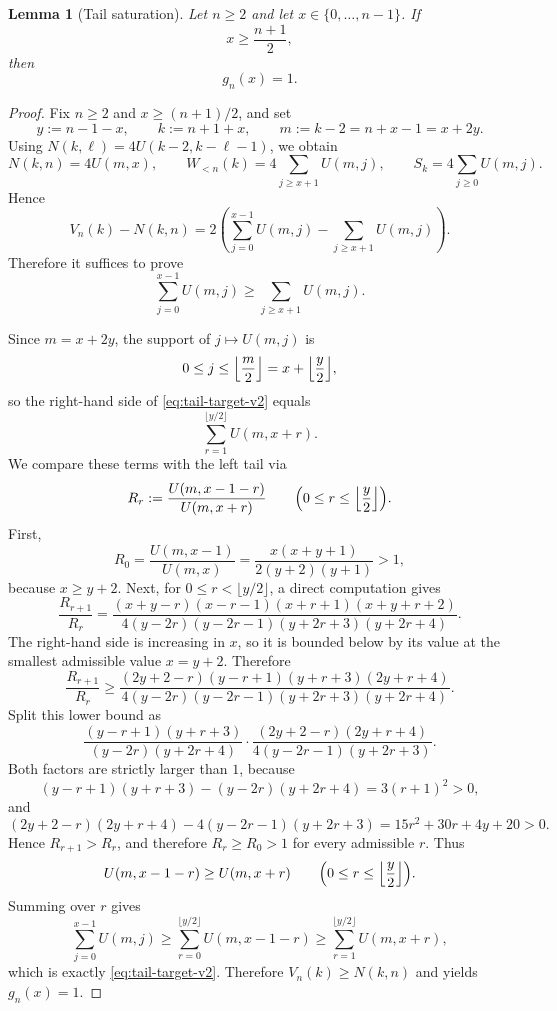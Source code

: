 \documentclass[10pt,a4paper]{amsart}
\newtheorem{lemma}{Lemma}
\begin{document}
\begin{lemma}[Tail saturation]\label{lem:tail}
Let $n\ge2$ and let $x\in\{0,\dots,n-1\}$. If
\[
x\ge \frac{n+1}{2},
\]
then
\[
g_n(x)=1.
\]
\end{lemma}

\begin{proof}
Fix $n\ge2$ and $x\ge (n+1)/2$, and set
\[
y:=n-1-x,
\qquad
k:=n+1+x,
\qquad
m:=k-2=n+x-1=x+2y.
\]
Using $N(k,\ell)=4U(k-2,k-\ell-1)$, we obtain
\[
N(k,n)=4U(m,x),
\qquad
W_{<n}(k)=4\sum_{j\ge x+1}U(m,j),
\qquad
S_k=4\sum_{j\ge0}U(m,j).
\]
Hence
\[
V_n(k)-N(k,n)
=2\left(\sum_{j=0}^{x-1}U(m,j)-\sum_{j\ge x+1}U(m,j)\right).
\]
Therefore it suffices to prove
\begin{equation}\label{eq:tail-target-v2}
\sum_{j=0}^{x-1}U(m,j)\ge \sum_{j\ge x+1}U(m,j).
\end{equation}

Since $m=x+2y$, the support of $j\mapsto U(m,j)$ is
\[
0\le j\le \Bigl\lfloor\frac m2\Bigr\rfloor=x+\Bigl\lfloor\frac y2\Bigr\rfloor,
\]
so the right-hand side of \eqref{eq:tail-target-v2} equals
\[
\sum_{r=1}^{\lfloor y/2\rfloor}U(m,x+r).
\]
We compare these terms with the left tail via
\[
R_r:=\frac{U(m,x-1-r)}{U(m,x+r)}
\qquad
\Bigl(0\le r\le \Bigl\lfloor\frac y2\Bigr\rfloor\Bigr).
\]
First,
\[
R_0=\frac{U(m,x-1)}{U(m,x)}=\frac{x(x+y+1)}{2(y+2)(y+1)}>1,
\]
because $x\ge y+2$.
Next, for $0\le r<\lfloor y/2\rfloor$, a direct computation gives
\[
\frac{R_{r+1}}{R_r}
=
\frac{(x+y-r)(x-r-1)(x+r+1)(x+y+r+2)}
{4(y-2r)(y-2r-1)(y+2r+3)(y+2r+4)}.
\]
The right-hand side is increasing in $x$, so it is bounded below by its value at the smallest admissible value $x=y+2$. Therefore
\[
\frac{R_{r+1}}{R_r}
\ge
\frac{(2y+2-r)(y-r+1)(y+r+3)(2y+r+4)}
{4(y-2r)(y-2r-1)(y+2r+3)(y+2r+4)}.
\]
Split this lower bound as
\[
\frac{(y-r+1)(y+r+3)}{(y-2r)(y+2r+4)}
\cdot
\frac{(2y+2-r)(2y+r+4)}{4(y-2r-1)(y+2r+3)}.
\]
Both factors are strictly larger than $1$, because
\[
(y-r+1)(y+r+3)-(y-2r)(y+2r+4)=3(r+1)^2>0,
\]
and
\[
(2y+2-r)(2y+r+4)-4(y-2r-1)(y+2r+3)=15r^2+30r+4y+20>0.
\]
Hence $R_{r+1}>R_r$, and therefore $R_r\ge R_0>1$ for every admissible $r$. Thus
\[
U(m,x-1-r)\ge U(m,x+r)
\qquad
\Bigl(0\le r\le \Bigl\lfloor\frac y2\Bigr\rfloor\Bigr).
\]
Summing over $r$ gives
\[
\sum_{j=0}^{x-1}U(m,j)
\ge
\sum_{r=0}^{\lfloor y/2\rfloor}U(m,x-1-r)
\ge
\sum_{r=1}^{\lfloor y/2\rfloor}U(m,x+r),
\]
which is exactly \eqref{eq:tail-target-v2}. Therefore $V_n(k)\ge N(k,n)$ and  yields $g_n(x)=1$.
\end{proof}
\end{document}
